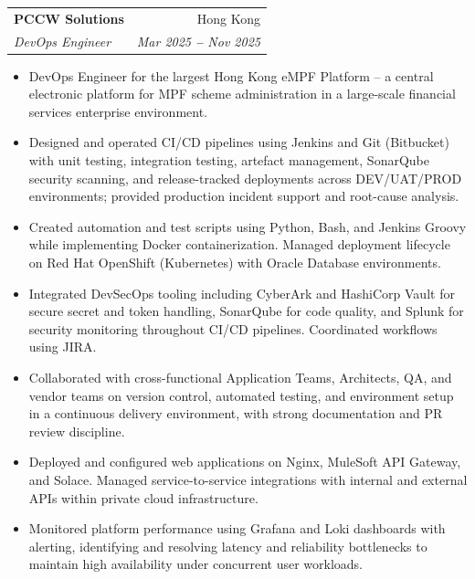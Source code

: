 \documentclass[letterpaper,11pt]{article}
\makeatletter
\newcommand{\resumeItem}[1]{
  \item\small{
    {#1 \vspace{-2pt}}
  }
}
\newcommand{\resumeSubheading}[4]{
  \vspace{-2pt}\item
    \begin{tabular*}{0.97\textwidth}[t]{l@{\extracolsep{\fill}}r}
      \textbf{#1} & #2 \\
      \textit{\small#3} & \textit{\small #4} \\
    \end{tabular*}\vspace{-7pt}
}
\newcommand{\resumeItemListStart}{\begin{itemize}}
\newcommand{\resumeItemListEnd}{\end{itemize}\vspace{-5pt}}
\makeatother
\begin{document}
    \resumeSubheading
      {PCCW Solutions}{Hong Kong}
      {DevOps Engineer}{Mar 2025 \textbf{--} Nov 2025}
        \resumeItemListStart
            \resumeItem{DevOps Engineer for the largest Hong Kong eMPF Platform -- a central electronic platform for MPF scheme administration in a large-scale financial services enterprise environment.}
            \resumeItem{Designed and operated CI/CD pipelines using Jenkins and Git (Bitbucket) with unit testing, integration testing, artefact management, SonarQube security scanning, and release-tracked deployments across DEV/UAT/PROD environments; provided production incident support and root-cause analysis.}
            \resumeItem{Created automation and test scripts using Python, Bash, and Jenkins Groovy while implementing Docker containerization. Managed deployment lifecycle on Red Hat OpenShift (Kubernetes) with Oracle Database environments.}
            \resumeItem{Integrated DevSecOps tooling including CyberArk and HashiCorp Vault for secure secret and token handling, SonarQube for code quality, and Splunk for security monitoring throughout CI/CD pipelines. Coordinated workflows using JIRA.}
            \resumeItem{Collaborated with cross-functional Application Teams, Architects, QA, and vendor teams on version control, automated testing, and environment setup in a continuous delivery environment, with strong documentation and PR review discipline.}
            \resumeItem{Deployed and configured web applications on Nginx, MuleSoft API Gateway, and Solace. Managed service-to-service integrations with internal and external APIs within private cloud infrastructure.}
            \resumeItem{Monitored platform performance using Grafana and Loki dashboards with alerting, identifying and resolving latency and reliability bottlenecks to maintain high availability under concurrent user workloads.}
        \resumeItemListEnd
\end{document}
